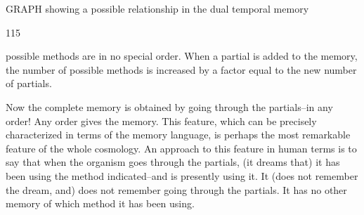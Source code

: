 \documentclass[10pt,twoside]{memoir}
\begin{document}
\begin{enumerate}
{\begin{enumerate}
\begin{sysrules}
\begin{sysrules}
\begin{sysrules}
\begin{sysrules}
{\begin{enumerate}
{GRAPH showing a possible relationship 
in the dual temporal memory 


115 


possible methods are in no special order. When a partial is added to the 
memory, the number of possible methods is increased by a factor equal to 
the new number of partials. 


Now the complete memory is obtained by going through the partials--in 
any order! Any order gives the memory. This feature, which can be 
precisely characterized in terms of the memory language, is perhaps the most 
remarkable feature of the whole cosmology. An approach to this feature in 
human terms is to say that when the organism goes through the partials, (it 
dreams that) it has been using the method indicated--and is presently using 
it. It (does not remember the dream, and) does not remember going through 
the partials. It has no other memory of which method it has been using. 

}
\end{enumerate}}
\end{sysrules}
\end{sysrules}
\end{sysrules}
\end{sysrules}
\end{enumerate}}
\end{enumerate}
\end{document}
